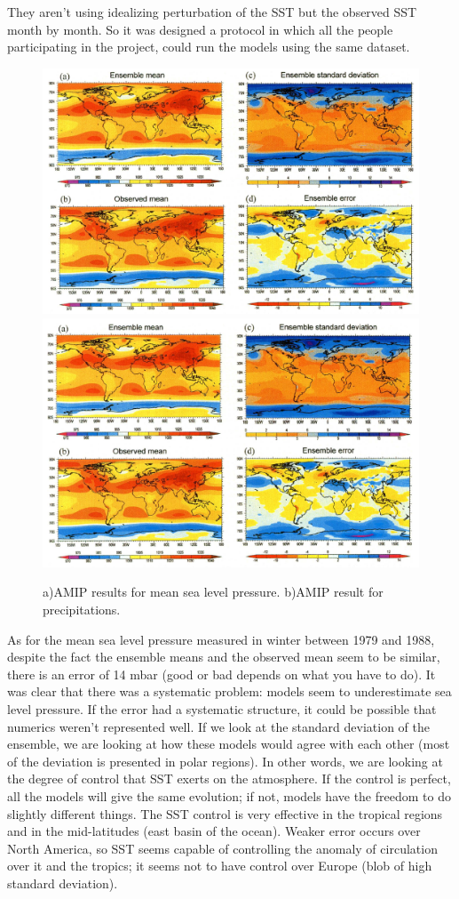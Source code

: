 They aren't using idealizing perturbation of the SST but the observed SST month by month. So it was designed a protocol in which all the people participating in the project, could run the models using the same dataset.  
\begin{figure}[htp!]
    \centering
    \includegraphics[width=0.45\linewidth]{uploads/Screenshot 2024-11-20 212548.png}\quad \includegraphics[width=0.45\linewidth]{uploads/Screenshot 2024-11-20 204551.png}
    \caption{a)AMIP results for mean sea level pressure. b)AMIP result for precipitations.}

\end{figure}
As for the mean sea level pressure measured in winter between 1979 and 1988, despite the fact the ensemble means and the observed mean seem to be similar, there is an error of 14 mbar (good or bad depends on what you have to do).
It was clear that there was a systematic problem: models seem to underestimate sea level pressure. If the error had a systematic structure, it could be possible that numerics weren't represented well. 
If we look at the standard deviation of the ensemble, we are looking at how these models would agree with each other (most of the deviation is presented in polar regions). In other words, we are looking at the degree of control that SST exerts on the atmosphere. If the control is perfect, all the models will give the same evolution; if not, models have the freedom to do slightly different things.   
The SST control is very effective in the tropical regions and in the mid-latitudes (east basin of the ocean). Weaker error occurs over North America, so SST seems capable of controlling the anomaly of circulation over it and the tropics; it seems not to have control over Europe (blob of high standard deviation).  

